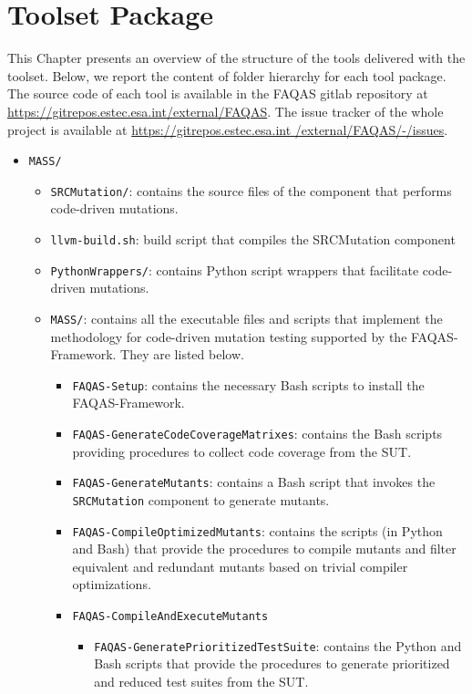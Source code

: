 
\chapter{Toolset Package}
\label{ch:toolset}
This Chapter presents an overview of the structure of the tools delivered with the \FAQAS toolset.
Below, we report the content of folder hierarchy for each tool package. The source code of each tool is available 
in the FAQAS gitlab repository at \url{https://gitrepos.estec.esa.int/external/FAQAS}.
The issue tracker of the whole project is available at \url{https://gitrepos.estec.esa.int /external/FAQAS/-/issues}. 

\begin{itemize}
	\item \texttt{MASS/}
	\begin{itemize}
		\item \texttt{SRCMutation/}: contains the source files of the component that performs code-driven mutations.
		\item \texttt{llvm-build.sh}: build script that compiles the SRCMutation component
		\item \texttt{PythonWrappers/}: contains Python script wrappers that facilitate code-driven mutations.
		\item \texttt{MASS/}: contains all the executable files and scripts that implement the methodology for code-driven mutation testing supported by  the FAQAS-Framework. They are listed below.
		\begin{itemize}
			\item \texttt{FAQAS-Setup}: contains the necessary Bash scripts to install the FAQAS-Framework.
			\item \texttt{FAQAS-GenerateCodeCoverageMatrixes}: contains the Bash scripts providing procedures to collect code coverage from the SUT.
			\item \texttt{FAQAS-GenerateMutants}: contains a Bash script that invokes the \texttt{SRCMutation} component to generate mutants.
			\item \texttt{FAQAS-CompileOptimizedMutants}: contains the scripts (in Python and Bash)  that provide the procedures to compile mutants and filter equivalent and redundant mutants based on trivial compiler optimizations.
			\item \texttt{FAQAS-CompileAndExecuteMutants}
			\begin{itemize}
				\item \texttt{FAQAS-GeneratePrioritizedTestSuite}: contains the Python and Bash scripts that provide the procedures to generate prioritized and reduced test suites from the SUT.


\end{itemize}
\end{itemize}
\end{itemize}
\end{itemize}
